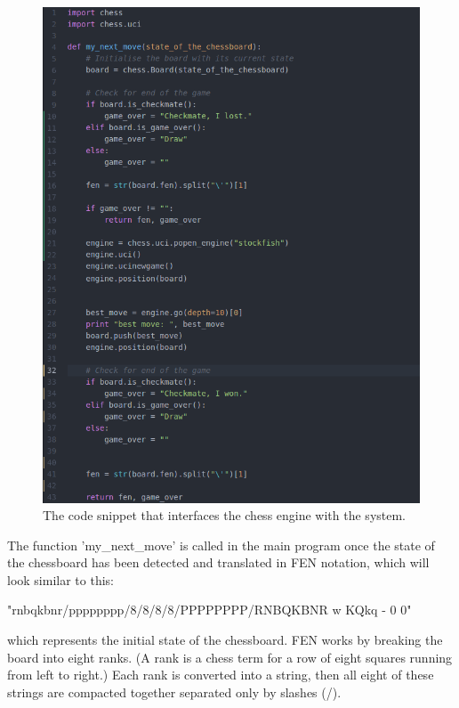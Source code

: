 \documentclass{l4proj}
\begin{document}
\begin{figure}[h!]
\centering
\includegraphics[scale=0.55]{chess_move.png}
\caption{The code snippet that interfaces the chess engine with the system.}
\label{ChessCodeSnippet}
\end{figure}

The function 'my\_next\_move' is called in the main program once the state of the chessboard has been detected and translated in FEN notation, which will look similar to this:


\vspace{4mm}
\centerline{"rnbqkbnr/pppppppp/8/8/8/8/PPPPPPPP/RNBQKBNR w KQkq - 0 0"}


which represents the initial state of the chessboard. FEN works by breaking the board into eight ranks. (A rank is a chess term for a row of eight squares running from left to right.) Each rank is converted into a string, then all eight of these strings are compacted together separated only by slashes (/). 
\end{document}
